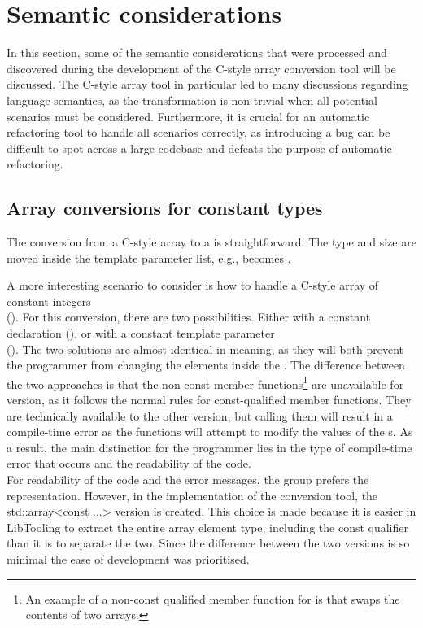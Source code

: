 
\section{Semantic considerations}
In this section, some of the semantic considerations that were processed and discovered during the development of the C-style array conversion tool will be discussed.
The C-style array tool in particular led to many discussions regarding language semantics, as the transformation is non-trivial when all potential scenarios must be considered.
Furthermore, it is crucial for an automatic refactoring tool to handle all scenarios correctly, as introducing a bug can be difficult to spot across a large codebase and defeats the purpose of automatic refactoring.

\subsection{Array conversions for constant types} \label{subsec:095:030:array_conversions}

The conversion from a C-style  array to a  is straightforward. The type and size are moved inside the template parameter list, e.g.,  becomes .

A more interesting scenario to consider is how to handle a C-style array of constant integers\\
(). For this conversion, there are two possibilities. Either with a constant  declaration
(), or with a constant template parameter\\
().
The two solutions are almost identical in meaning, as they will both prevent the programmer from changing the elements inside the .
The difference between the two approaches is that the non-const member functions\footnote{
    An example of a non-const qualified member function for  is  that swaps the contents of two arrays.
} are unavailable for  version, as it follows the normal rules for const-qualified member functions.
They are technically available to the other version, but calling them will result in a compile-time error as the functions will attempt to modify the values of the s.
As a result, the main distinction for the programmer lies in the type of compile-time error that occurs and the readability of the code.\\
For readability of the code and the error messages, the group prefers the  representation.
However, in the implementation of the conversion tool, the std::array<const ...> version is created. This choice is made because it is easier in LibTooling to extract the entire array element type, including the const qualifier than it is to separate the two.
Since the difference between the two versions is so minimal the ease of development was prioritised.

